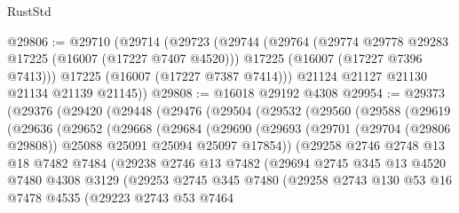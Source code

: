 \begin{lexlean}{RustStd}
\begin{coremodule}
@29806 := @29710
    (@29714
      (@29723
        (@29744
          (@29764
            (@29774 @29778 @29283 @17225 (@16007 (@17227 @7407 @4520)))
            @17225
            (@16007 (@17227 @7396 @7413)))
          @17225
          (@16007 (@17227 @7387 @7414)))
        @21124
        @21127
        @21130
        @21134
        @21139
        @21145))
@29808 := @16018 @29192 @4308
@29954 := @29373
    (@29376
      (@29420
        (@29448
          (@29476
            (@29504
              (@29532
                (@29560
                  (@29588
                    (@29619
                      (@29636
                        (@29652
                          (@29668
                            (@29684
                              (@29690
                                (@29693
                                  (@29701
                                    (@29704 (@29806 @29808))
                                    @25088
                                    @25091
                                    @25094
                                    @25097
                                    @17854))
                                (@29258
                                  @2746
                                  @2748
                                  @13
                                  @18
                                  @7482
                                  @7484
                                  (@29238
                                    @2746
                                    @13
                                    @7482
                                    (@29694
                                      @2745
                                      @345
                                      @13
                                      @4520
                                      @7480
                                      @4308
                                      @3129
                                      (@29253
                                        @2745
                                        @345
                                        @7480
                                        (@29258
                                          @2743
                                          @130
                                          @53
                                          @16
                                          @7478
                                          @4535
                                          (@29223
                                            @2743
                                            @53
                                            @7464

\end{coremodule}
\end{lexlean}
